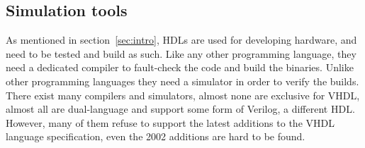 \documentclass[11pt,british]{article}
\begin{document}


\subsection{Simulation tools}
As mentioned in section~\ref{sec:intro}, \gls{HDL}s are used for developing hardware, and need to be tested and build as such. Like any other programming language, they need a dedicated compiler to fault-check the code and build the binaries. Unlike other programming languages they need a simulator in order to verify the builds. There exist many compilers and simulators, almost none are exclusive for \gls{VHDL}, almost all are dual-language and support some form of Verilog, a different HDL. However, many of them refuse to support the latest additions to the VHDL language specification, even the 2002 additions are hard to be found.\cite{ActiveHDL,Cadence,ISE,Quartus}
\end{document}
